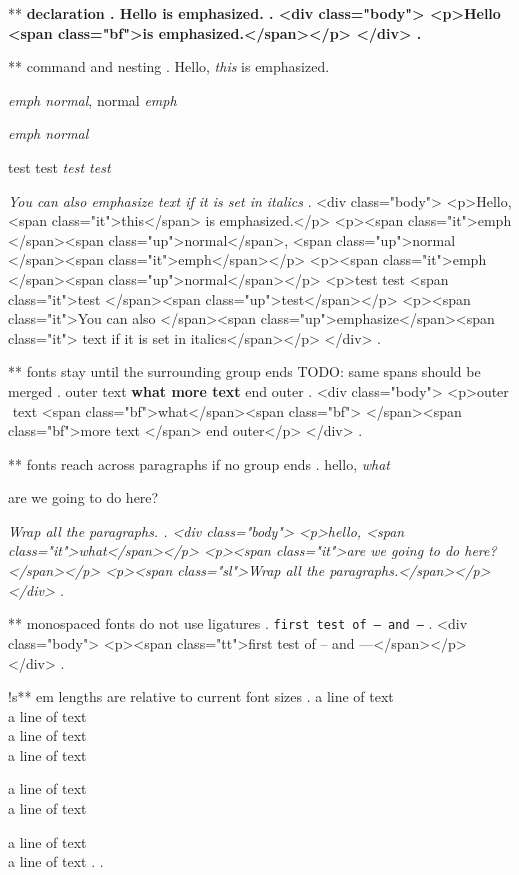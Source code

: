 ** \bfseries declaration
.
Hello \bfseries is emphasized.
.
<div class="body">
<p>Hello <span class="bf">is emphasized.</span></p>
</div>
.

** \emph{} command and nesting
.
Hello, \emph{this} is emphasized.

\emph{emph \textup{normal}}, \textup{normal \emph{emph}}

\emph{emph \emph{normal}}

test {test \em\em\em test \em test}

\textit{You can also \emph{emphasize} text if it is set in italics}
.
<div class="body">
<p>Hello, <span class="it">this</span> is emphasized.</p>
<p><span class="it">emph </span><span class="up">normal</span>, <span class="up">normal </span><span class="it">emph</span></p>
<p><span class="it">emph </span><span class="up">normal</span></p>
<p>test test <span class="it">test </span><span class="up">test</span></p>
<p><span class="it">You can also </span><span class="up">emphasize</span><span class="it"> text if it is set in italics</span></p>
</div>
.


** fonts stay until the surrounding group ends      TODO: same spans should be merged
.
outer { text \bfseries {what} more text } end outer
.
<div class="body">
<p>outer ​ text <span class="bf">what</span><span class="bf">​ </span><span class="bf">more text </span>​ end outer</p>
</div>
.


** fonts reach across paragraphs if no group ends
.
hello, \itshape what

are we going to do here?

\slshape
Wrap all the paragraphs.
.
<div class="body">
<p>hello, <span class="it">what</span></p>
<p><span class="it">are we going to do here?</span></p>
<p><span class="sl">Wrap all the paragraphs.</span></p>
</div>
.


** monospaced fonts do not use ligatures
.
\texttt{first test of -- and ---}
.
<div class="body">
<p><span class="tt">first test of -- and ---</span></p>
</div>
.



!s** em lengths are relative to current font sizes
.
\small
a line of text\\[1em]
a line of text\\[1em]
\Huge
a line of text\\[1em]
a line of text

\small
a line of text\\[1em]
a line of text

\Huge
a line of text\\[1em]
a line of text
.
.
